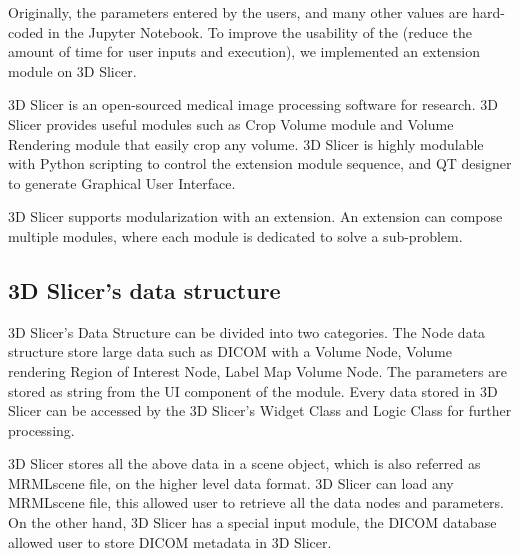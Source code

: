Originally, the parameters entered by the users, and many other values are hard-coded in the Jupyter Notebook. To improve the usability of the \progname{} (reduce the amount of time for user inputs and execution), we implemented an extension module on 3D Slicer. 

3D Slicer is an open-sourced medical image processing software for research. 3D Slicer provides useful modules such as Crop Volume module and Volume Rendering module that easily crop any volume. 3D Slicer is highly modulable with Python scripting to control the extension module sequence, and QT designer to generate Graphical User Interface.

%

3D Slicer supports modularization with an extension. An extension can compose multiple modules, where each module is dedicated to solve a sub-problem.
\subsection{3D Slicer's data structure}

3D Slicer's Data Structure can be divided into two categories. The Node data structure store large data such as DICOM with a Volume Node, Volume rendering Region of Interest Node, Label Map Volume Node. The parameters are stored as string from the UI component of the module. Every data stored in 3D Slicer can be accessed by the 3D Slicer's Widget Class and Logic Class for further processing. 

3D Slicer stores all the above data in a scene object, which is also referred as MRMLscene file, on the higher level data format. 3D Slicer can load any MRMLscene file, this allowed user to retrieve all the data nodes and parameters. On the other hand, 3D Slicer has a special input module, the DICOM database allowed user to store DICOM metadata in 3D Slicer.

